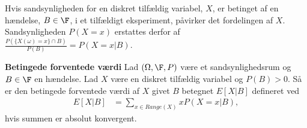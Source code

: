 



 






Hvis sandsynligheden for en diskret tilfældig variabel, $X$, er betinget af en hændelse, $B\in\F$, i et tilfældigt eksperiment, påvirker det fordelingen af $X$. Sandsynligheden $P(X=x)$ erstattes derfor af $\displaystyle\frac{P\left(\{X(\omega)=x\}\cap B\right)}{P(B)}=P(X=x|B)$.

\begin{minipage}\textwidth
\begin{defn}\textbf{Betingede forventede værdi}\label{def:betinget_forventet_værdi} %
\newline
Lad $(\Omega, \F, P)$ være et sandsynlighedsrum og $B\in\F$ en hændelse. Lad $X$ være en diskret tilfældig variabel og $P(B)>0$. Så er den betingede forventede værdi af $X$ givet $B$ betegnet $E[X|B]$ defineret ved 
\begin{align*}
    E[X|B]&=\sum_{x\in Range(X)}xP(X=x|B),
\end{align*}
hvis summen er absolut konvergent.
\end{defn}
\end{minipage}

